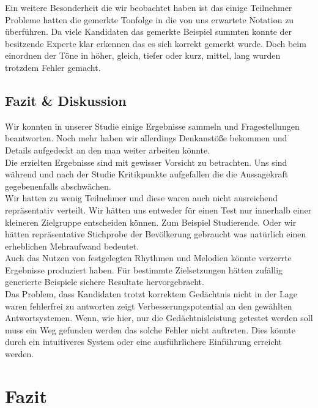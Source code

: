 \documentclass{acm_proc_article-sp}
\begin{document}
Ein weitere Besonderheit die wir beobachtet haben ist das einige Teilnehmer Probleme hatten die gemerkte Tonfolge in die von uns erwartete Notation zu überführen. Da viele Kandidaten das gemerkte Beispiel summten konnte der besitzende Experte klar erkennen das es sich korrekt gemerkt wurde. Doch beim einordnen der Töne in höher, gleich, tiefer oder kurz, mittel, lang wurden trotzdem Fehler gemacht.
\subsection{Fazit \& Diskussion}
Wir konnten in unserer Studie einige Ergebnisse sammeln und Fragestellungen beantworten. Noch mehr haben wir allerdings Denkanstöße bekommen und Details aufgedeckt an den man weiter arbeiten könnte.\\
Die erzielten Ergebnisse sind mit gewisser Vorsicht zu betrachten. Uns sind während und nach der Studie Kritikpunkte aufgefallen die die Aussagekraft gegebenenfalls abschwächen.\\
Wir hatten zu wenig Teilnehmer und diese waren auch nicht ausreichend repräsentativ verteilt. Wir hätten uns entweder für einen Test nur innerhalb einer kleineren Zielgruppe entscheiden können. Zum Beispiel Studierende. Oder wir hätten repräsentative Stichprobe der Bevölkerung gebraucht was natürlich einen erheblichen Mehraufwand bedeutet.\\
Auch das Nutzen von festgelegten Rhythmen und Melodien könnte verzerrte Ergebnisse produziert haben. Für bestimmte Zielsetzungen hätten zufällig generierte Beispiele sichere Resultate hervorgebracht. \\
Das Problem, dass Kandidaten trotzt korrektem Gedächtnis nicht in der Lage waren fehlerfrei zu antworten zeigt Verbesserungspotential an den gewählten Antwortsystemen. Wenn, wie hier, nur die Gedächtnisleistung getestet werden soll muss ein Weg gefunden werden das solche Fehler nicht auftreten. Dies könnte durch ein intuitiveres System oder eine ausführlichere Einführung erreicht werden.


\section{Fazit}
\printbibliography
\end{document}
